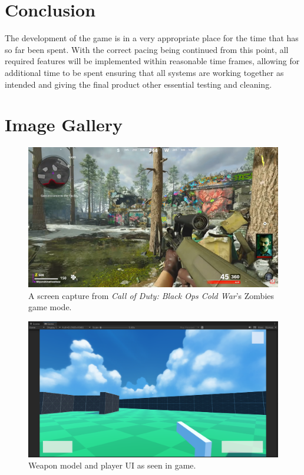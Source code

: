 \documentclass[11pt]{article}
\begin{document}
\section{Conclusion}
The development of the game is in a very appropriate place for the time that has so far been spent.
With the correct pacing being continued from this point, all required features will be implemented
within reasonable time frames, allowing for additional time to be spent ensuring that all systems
are working together as intended and giving the final product other essential testing and
cleaning. \\

\clearpage

\appendix

\section{Image Gallery}
\begin{figure}[htb] 
    \centering
    \includegraphics[width=\columnwidth]{inspo}
    \caption{A screen capture from \textit{Call of Duty: Black Ops Cold War}'s Zombies game mode.}
    \label{fig:inspo}
\end{figure}

\begin{figure}[htb] 
    \centering
    \includegraphics[width=\columnwidth]{weapon}
    \caption{Weapon model and player UI as seen in game.}
    \label{fig:weapon}
\end{figure}
\end{document}
